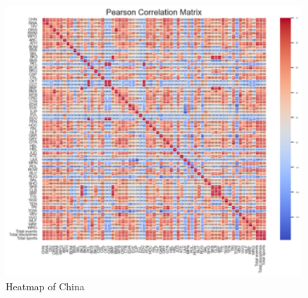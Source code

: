 \documentclass{mcmthesis}
\begin{document}
\begin{itemize}
\begin{figure}[htbp]
    \centering
    \includegraphics[width=12cm]{res/graph/heatmapofChina.png}
    \caption{Heatmap of China} \label{Figure 4}
\end{figure}

\end{itemize}








\end{document}
